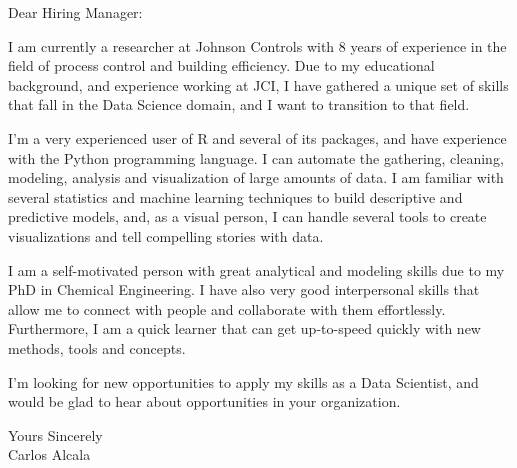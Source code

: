 \documentclass[a4paper,english]{friggeri-letter}
\begin{document}

\address{
   1406 E Russell Ave \\
   Milwaukee, Wisconsin
}



\opening{Dear Hiring Manager:}

I am currently a researcher at Johnson Controls with 8 years of experience in the field of process control and building efficiency. Due to my educational background, and experience working at JCI, I have gathered a unique set of skills that fall in the Data Science domain, and I want to transition to that field.

I'm a very experienced user of R and several of its packages, and have experience with the Python programming language. I can automate the gathering, cleaning, modeling, analysis and visualization of large amounts of data. I am familiar with several statistics and machine learning techniques to build descriptive and predictive models, and, as a visual person, I can handle several tools to create visualizations and tell compelling stories with data.

I am a self-motivated person with great analytical and modeling skills due to my PhD in Chemical Engineering. I have also very good interpersonal skills that allow me to connect with people and collaborate with them effortlessly. Furthermore, I am a quick learner that can get up-to-speed quickly with new methods, tools and concepts.

I'm looking for new opportunities to apply my skills as a Data Scientist, and would be glad to hear about opportunities in your organization.


\closing{
   Yours Sincerely\\
   Carlos Alcala}
\end{document}
